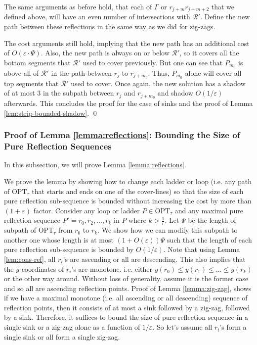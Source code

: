 \documentclass[pdflatex,sn-mathphys-num]{sn-jnl}
\theoremstyle{thmstyleone}
\newcommand{\eps}{\varepsilon}
\newcommand{\OPT}{{\text{OPT}}}
\begin{document}
    The same arguments as before hold, that each of $\Gamma$ or $r_{j+m}\left. r_{j + m + 2}\right.$ that we defined above, will have an even number of intersections with $\mathcal R'$. Define the new path between these reflections in
    the same way as we did for zig-zags.
	
    The cost arguments still hold, implying that the new path has an additional cost of $O(\eps\cdot\Psi)$. Also, the new path is always on or below $\mathcal R'$, so it covers all the bottom segments that $\mathcal R'$ used to cover previously. But one can see that $P_{m_0}$ is above all of $\mathcal R'$ in the path between $r_{j}$ to $r_{j + m_0}$. Thus, $P_{m_0}$ alone will cover all top segments that $\mathcal R'$ used to cover. Once again, the new solution has a shadow of at most $3$ in the subpath between $r_j$ and $r_{j+m_0}$ and shadow $O(1/\eps)$ afterwards.
    This concludes the proof for the case of sinks and the proof of 
    Lemma \ref{lem:strip-bounded-shadow}.
    \qed

\subsubsection{Proof of Lemma \ref{lemma:reflections}: Bounding the Size of Pure Reflection Sequences}\label{sec:lemma-pure-reflection-size}
In this subsection, we will prove Lemma \ref{lemma:reflections}. 

We prove the lemma by showing how to change each ladder or loop (i.e. any path of $\OPT_\tau$ that starts and ends on one of the cover-lines) so that the size of each pure reflection sub-sequence is bounded without increasing the cost by more than $(1+\eps)$ factor. Consider any loop or ladder $P\in \OPT_\tau$ and any maximal pure reflection sequence  $P'=r_0, r_2, \dots, r_k $ in $P$ where $k> \frac1\epsilon $. Let $\Psi$ be the length of subpath of $\OPT_\tau$ from $r_0$ to $r_k$.
We show how we can modify this subpath to another one whose length is at most $(1+O(\eps))\Psi$ such that the length  of each
pure reflection sub-sequence is bounded by $O(1/\eps)$.
Note that using Lemma \ref{lem:cons-ref},  all $r_i $'s are ascending or all are descending. 
This also implies that the $ y $-coordinates of $r_i$'s are monotone. i.e. either $ y(r_0)\le y(r_1)\le \dots \le y(r_k) $ or the other way around. Without loss of generality, assume it is the former case and so all are ascending reflection points.
Proof of Lemma \ref{lemma:zig-zag}, shows if we have a maximal monotone (i.e. all ascending or all descending) sequence of reflection points, then it consists of at most a sink followed by a zig-zag, followed by a sink. Therefore, it suffices to bound the size of pure reflection sequence in a single sink or a zig-zag alone as a function of $1/\eps$. So let's assume all $ r_i $'s form a single sink or all form a single zig-zag.
\end{document}
